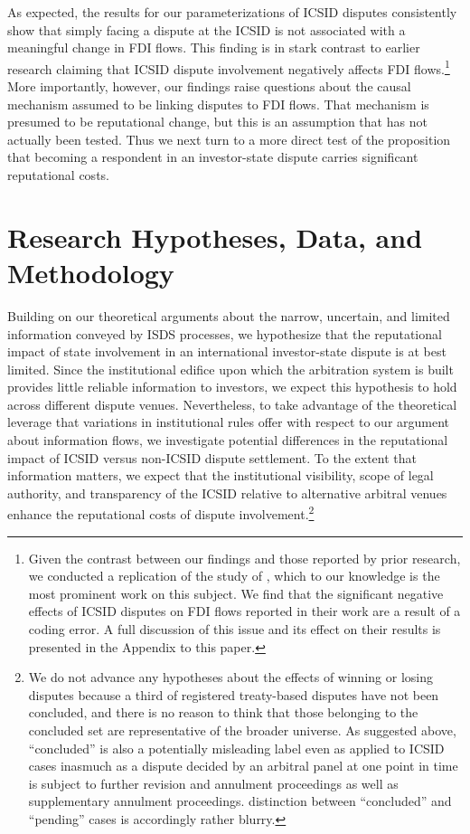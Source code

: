 \documentclass[12pt,onesided]{amsart}
\begin{document}
As expected, the results for our parameterizations of ICSID disputes consistently show that simply facing a dispute at the ICSID is not associated with a meaningful change in FDI flows. This finding is in stark contrast to earlier research claiming that ICSID dispute involvement negatively affects FDI flows.\footnote{Given the contrast between our findings and those reported by prior research, we conducted a replication of the study of \citet{allee:peinhardt:2011}, which to our knowledge is the most prominent work on this subject. We find that the significant negative effects of ICSID disputes on FDI flows reported in their work are a result of a coding error. A full discussion of this issue and its effect on their results is presented in the Appendix to this paper.} More importantly, however, our findings raise questions about the causal mechanism assumed to be linking disputes to FDI flows. That mechanism is presumed to be reputational change, but this is an assumption that has not actually been tested. Thus we next turn to a more direct test of the proposition that becoming a respondent in an investor-state dispute carries significant reputational costs.

\section*{Research Hypotheses, Data, and Methodology}

Building on our theoretical arguments about the narrow, uncertain, and limited information conveyed by ISDS processes, we hypothesize that the reputational impact of state involvement in an international investor-state dispute is at best limited. Since the institutional edifice upon which the arbitration system is built provides little reliable information to investors, we expect this hypothesis to hold across different dispute venues. Nevertheless, to take advantage of the theoretical leverage that variations in institutional rules offer with respect to our argument about information flows, we investigate potential differences in the reputational impact of  ICSID versus  non-ICSID dispute settlement. To the extent that information matters, we expect that the institutional visibility, scope of legal authority, and transparency of the ICSID relative to alternative arbitral venues enhance the reputational costs of dispute involvement.\footnote{We do not advance any hypotheses about the effects of winning or losing disputes because a third of registered treaty-based disputes have not been concluded, and there is no reason to think that those belonging to the concluded set are representative of the broader universe. As suggested above, ``concluded'' is also a potentially misleading label even as applied to ICSID cases inasmuch as a dispute decided by an arbitral panel at one point in time is subject to further revision and annulment proceedings as well as supplementary annulment proceedings. distinction between ``concluded'' and ``pending'' cases is accordingly rather blurry.}
\end{document}
